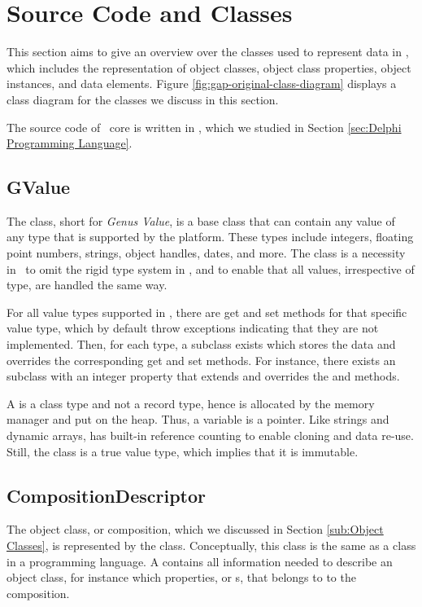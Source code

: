 \section{Source Code and Classes}
\label{sec:Source Code and Classes}
This section aims to give an overview over the classes used to represent data in \gap, which includes the representation of object classes, object class properties, object instances, and data elements. Figure \ref{fig:gap-original-class-diagram} displays a class diagram for the classes we discuss in this section.

The source code of \gap~core is written in \delphi, which we studied in Section \ref{sec:Delphi Programming Language}.

\subsection{GValue}
\label{sub:GValue}
The  class, short for \textit{Genus Value}, is a base class that can contain any value of any type that is supported by the platform. These types include integers, floating point numbers, strings, object handles, dates, and more. The  class is a necessity in \gap~to omit the rigid type system in \delphi, and to enable that all values, irrespective of type, are handled the same way.

For all value types supported in \gap, there are get and set methods for that specific value type, which by default throw exceptions indicating that they are not implemented. Then, for each type, a subclass exists which stores the data and overrides the corresponding get and set methods. For instance, there exists an  subclass with an integer property that extends  and overrides the  and  methods. 

A  is a class type and not a record type, hence is allocated by the memory manager and put on the heap. Thus, a  variable is a pointer. Like strings and dynamic arrays,  has built-in reference counting to enable cloning and data re-use. Still, the class is a true value type, which implies that it is immutable.

\subsection{CompositionDescriptor}
\label{sub:CompositionDescriptor}
The object class, or composition, which we discussed in Section \ref{sub:Object Classes}, is represented by the  class. Conceptually, this class is the same as a class in a programming language. A  contains all information needed to describe an object class, for instance which properties, or s, that belongs to to the composition.

